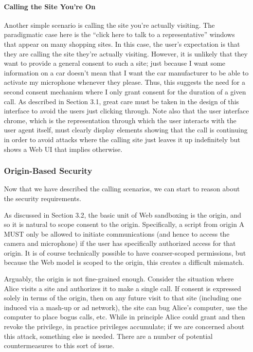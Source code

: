 \documentclass{article}
\begin{document}
\paragraph{Calling the Site You're On}

Another simple scenario is calling the site you're actually visiting.
The paradigmatic case here is the ``click here to talk to a
representative'' windows that appear on many shopping sites.  In this
case, the user's expectation is that they are calling the site
they're actually visiting.  However, it is unlikely that they want to
provide a general consent to such a site; just because I want some
information on a car doesn't mean that I want the car manufacturer to
be able to activate my microphone whenever they please.  Thus, this
suggests the need for a second consent mechanism where I only grant
consent for the duration of a given call.  As described in
Section 3.1, great care must be taken in the design of this interface
to avoid the users just clicking through.  Note also that the user
interface chrome, which is the representation through which the user
interacts with the user agent itself, must clearly display elements
showing that the call is continuing in order to avoid attacks where
the calling site just leaves it up indefinitely but shows a Web UI
that implies otherwise.

\subsubsection{Origin-Based Security}

Now that we have described the calling scenarios, we can start to
reason about the security requirements.

As discussed in Section 3.2, the basic unit of Web sandboxing is the
origin, and so it is natural to scope consent to the origin.
Specifically, a script from origin A MUST only be allowed to initiate
communications (and hence to access the camera and microphone) if the
user has specifically authorized access for that origin.  It is of
course technically possible to have coarser-scoped permissions, but
because the Web model is scoped to the origin, this creates a
difficult mismatch.

Arguably, the origin is not fine-grained enough.  Consider the
situation where Alice visits a site and authorizes it to make a
single call.  If consent is expressed solely in terms of the origin,
then on any future visit to that site (including one induced via a
mash-up or ad network), the site can bug Alice's computer, use the
computer to place bogus calls, etc.  While in principle Alice could
grant and then revoke the privilege, in practice privileges
accumulate; if we are concerned about this attack, something else is
needed.  There are a number of potential countermeasures to this sort
of issue.
\end{document}

